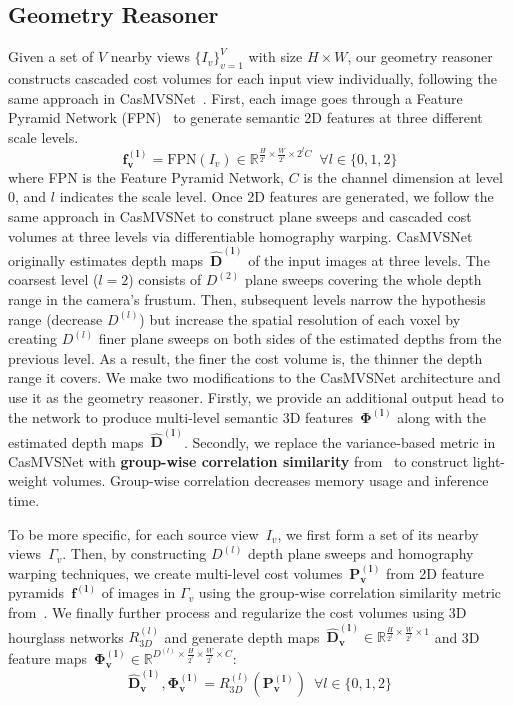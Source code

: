 \subsection{Geometry Reasoner} \label{sec:c3_geometry}
Given a set of $V$ nearby views $\{I_{v}\}_{v=1}^{V}$ with size $H \times W$, our geometry reasoner constructs cascaded cost volumes for each input view individually, following the same approach in CasMVSNet~\cite{gu2020cascade}. First, each image goes through a Feature Pyramid Network (FPN)~\cite{lin2017feature} to generate semantic 2D features at three different scale levels.
\begin{equation}
    \boldsymbol{f^{(l)}_{v}}=\text{FPN} \left( I_v \right) \in \mathbb{R}^{\frac{H}{2^l} \times \frac{W}{2^l} \times 2^lC} \phantom{0} \forall l \in \{0, 1, 2\}
\end{equation}
where FPN is the Feature Pyramid Network, $C$ is the channel dimension at level 0, and $l$ indicates the scale level. Once 2D features are generated, we follow the same approach in CasMVSNet to construct plane sweeps and cascaded cost volumes at three levels via differentiable homography warping. CasMVSNet originally estimates depth maps~$\boldsymbol{\hat{D}^{(l)}}$ of the input images at three levels. The coarsest level ($l=2$) consists of $D^{(2)}$ plane sweeps covering the whole depth range in the camera's frustum. Then, subsequent levels narrow the hypothesis range (decrease $D^{(l)}$) but increase the spatial resolution of each voxel by creating $D^{(l)}$ finer plane sweeps on both sides of the estimated depths from the previous level. As a result, the finer the cost volume is, the thinner the depth range it covers. We make two modifications to the CasMVSNet architecture and use it as the geometry reasoner. Firstly, we provide an additional output head to the network to produce multi-level semantic 3D features~$\boldsymbol{\Phi^{(l)}}$ along with the estimated depth maps~$\boldsymbol{\hat{D}^{(l)}}$. Secondly, we replace the variance-based metric in CasMVSNet with \textbf{group-wise correlation similarity} from~\cite{xu2020learning} to construct light-weight volumes. Group-wise correlation decreases memory usage and inference time.

To be more specific, for each source view~$I_{v}$, we first form a set of its nearby views~$\Gamma_{v}$. Then, by constructing $D^{(l)}$ depth plane sweeps and homography warping techniques, we create multi-level cost volumes~$\boldsymbol{P^{(l)}_{v}}$ from 2D feature pyramids~$\boldsymbol{f^{(l)}}$ of images in $\Gamma_{v}$ using the group-wise correlation similarity metric from~\cite{xu2020learning}. We finally further process and regularize the cost volumes using 3D hourglass networks $R^{(l)}_{3D}$ and generate depth maps~$\boldsymbol{\hat{D}^{(l)}_{v}} \in \mathbb{R}^{\frac{H}{2^l} \times \frac{W}{2^l} \times 1}$ and 3D feature maps~$\boldsymbol{\Phi^{(l)}_{v}} \in \mathbb{R}^{D^{(l)} \times \frac{H}{2^l} \times \frac{W}{2^l} \times C}$:
\begin{equation}
    \boldsymbol{\hat{D}^{(l)}_{v}}, \boldsymbol{\Phi^{(l)}_{v}}=R^{(l)}_{3D} \left( \boldsymbol{P^{(l)}_{v}} \right)  \phantom{0} \forall l \in \{0, 1, 2\}
\end{equation}

